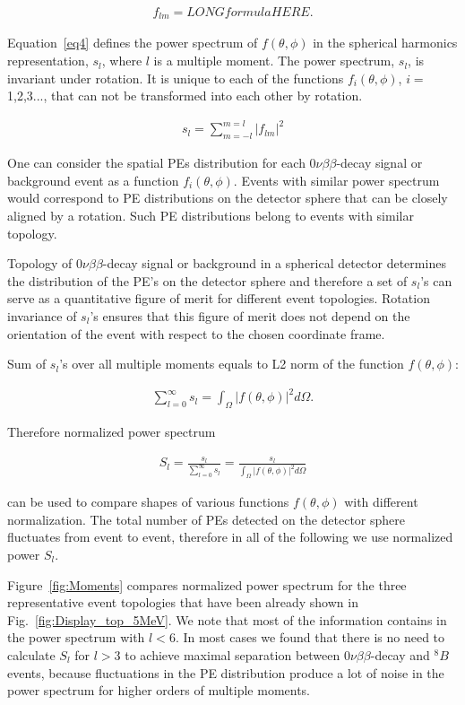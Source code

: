 \documentclass[12pt,twoside,letterpaper]{article}
\newcommand{\vbb}{0\nu\beta\beta}
\newcommand{\B}{^{8}B}
\begin{document}
\begin{eqnarray}
\label{eq3}
f_{lm} = LONGformulaHERE.
\end{eqnarray}

Equation~\ref{eq4} defines the power spectrum of $f(\theta,\phi)$ in the spherical harmonics representation, $s_l$, where $l$ is a multiple moment. The power spectrum, $s_l$, is invariant under rotation. It is unique to each of the functions $f_i(\theta,\phi)$, $i=$1,2,3..., that can not be transformed into each other by rotation.

\begin{eqnarray}
\label{eq4}
s_l = \sum_{m=-l}^{m=l} |f_{lm}|^2
\end{eqnarray}

One can consider the spatial PEs distribution for each $\vbb$-decay signal or background event as a function $f_i(\theta,\phi)$. Events with similar power spectrum would correspond to PE distributions on the detector sphere that can be closely aligned by a rotation. Such PE distributions belong to events with similar topology.

Topology of $\vbb$-decay signal or background in a spherical detector determines the distribution of the PE's on the detector sphere and therefore a set of $s_l$'s can serve as a quantitative figure of merit for different event topologies. Rotation invariance of $s_l$'s ensures that this figure of merit does not depend on the orientation of the event with respect to the chosen coordinate frame.


Sum of $s_l$'s over all multiple moments equals to L2 norm of the function $f(\theta,\phi)$:

\begin{eqnarray}
\label{eq5}
\sum_{l=0}^{\infty} s_l = \int_{\Omega} |f(\theta,\phi)|^2 d\Omega.
\end{eqnarray}

Therefore normalized power spectrum 

\begin{eqnarray}
\label{eq5}
S_l = \frac{s_l}{\sum_{l=0}^{\infty} s_l} =  \frac{s_l}{\int_{\Omega} |f(\theta,\phi)|^2 d\Omega}
\end{eqnarray}

can be used to compare shapes of various functions $f(\theta,\phi)$ with different normalization. The total number of PEs detected on the detector sphere fluctuates from event to event, therefore in all of the following we use normalized power $S_l$.

Figure~\ref{fig:Moments} compares normalized power spectrum for the three representative event topologies that have been already shown in Fig.~\ref{fig:Display_top_5MeV}. We note that most of the information contains in the power spectrum with $l<$6. In most cases we found that there is no need to calculate $S_l$ for $l>$3 to achieve maximal separation between $\vbb$-decay and $\B$ events, because fluctuations in the PE distribution produce a lot of noise in the power spectrum for higher orders of multiple moments.
\end{document}
